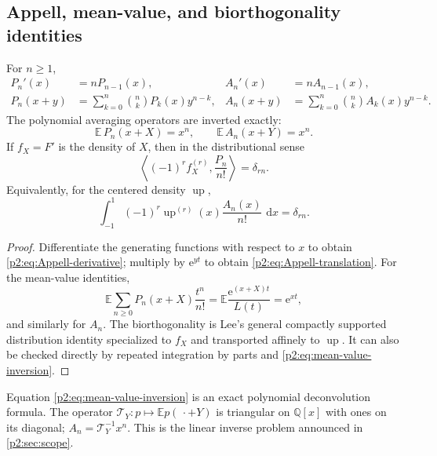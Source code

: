 \documentclass[11pt,oneside]{article}
\numberwithin{equation}{section}
\theoremstyle{definition}
\theoremstyle{remark}
\newcommand{\Q}{\mathbb Q}
\newcommand{\Up}{\operatorname{up}}
\newcommand{\e}{\mathrm e}
\newcommand{\dd}{\,\mathrm d}
\begin{document}
\subsection{Appell, mean-value, and biorthogonality identities}

\begin{proposition}
\label{p2:prop:Appell-package}
For $n\ge1$,
\begin{align}
 P_n'(x)&=nP_{n-1}(x),
 &A_n'(x)&=nA_{n-1}(x),
 \label{p2:eq:Appell-derivative}\\
 P_n(x+y)&=\sum_{k=0}^n\binom nkP_k(x)y^{n-k},
 &A_n(x+y)&=\sum_{k=0}^n\binom nkA_k(x)y^{n-k}.
 \label{p2:eq:Appell-translation}
\end{align}
The polynomial averaging operators are inverted exactly:
\begin{equation}
 \boxed{
 \mathbb E\,P_n(x+X)=x^n,
 \qquad
 \mathbb E\,A_n(x+Y)=x^n.
 }
 \label{p2:eq:mean-value-inversion}
\end{equation}
If $f_X=F'$ is the density of $X$, then in the distributional sense
\begin{equation}
 \left\langle(-1)^r f_X^{(r)},\frac{P_n}{n!}\right\rangle=\delta_{rn}.
 \label{p2:eq:P-biorthogonal}
\end{equation}
Equivalently, for the centered density $\Up$,
\begin{equation}
 \int_{-1}^{1}(-1)^r\Up^{(r)}(x)\frac{A_n(x)}{n!}\,\dd x
 =\delta_{rn}.
 \label{p2:eq:A-biorthogonal}
\end{equation}
\end{proposition}

\begin{proof}
Differentiate the generating functions with respect to $x$ to obtain
\eqref{p2:eq:Appell-derivative}; multiply by $\e^{yt}$ to obtain
\eqref{p2:eq:Appell-translation}.  For the mean-value identities,
\[
 \mathbb E\sum_{n\ge0}P_n(x+X)\frac{t^n}{n!}
 =\mathbb E\frac{\e^{(x+X)t}}{L(t)}=\e^{xt},
\]
and similarly for $A_n$.  The biorthogonality is Lee's general compactly supported
distribution identity specialized to $f_X$ and transported affinely to $\Up$.  It can also be checked
directly by repeated integration by parts and \eqref{p2:eq:mean-value-inversion}.
\end{proof}

\begin{remark}
Equation \eqref{p2:eq:mean-value-inversion} is an exact polynomial deconvolution formula.  The operator
$\mathcal T_Y:p\mapsto\mathbb E p(\,\cdot+Y)$ is triangular on $\Q[x]$ with ones on its diagonal;
$A_n=\mathcal T_Y^{-1}x^n$.  This is the linear inverse problem announced in
\cref{p2:sec:scope}.
\end{remark}
\end{document}
